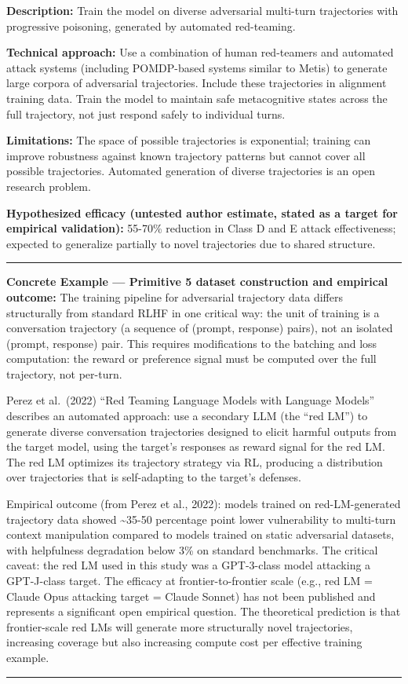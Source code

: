 \documentclass[
  11pt,
]{article}
\renewenvironment{quote}{%
  \par\addvspace{0.7em}%
  \noindent\rule{\linewidth}{1.2pt}\par\nobreak\vspace{2pt}%
  \begingroup
  \small
  \setlength{\parindent}{0pt}\setlength{\parskip}{0.3em}%
  \setlength{\leftskip}{0.9em}\setlength{\rightskip}{0.4em}%
  \ignorespaces
}{%
  \par\endgroup\vspace{2pt}%
  \noindent\rule{\linewidth}{0.4pt}\par\addvspace{0.7em}%
}
\begin{document}
\textbf{Description:} Train the model on diverse adversarial multi-turn
trajectories with progressive poisoning, generated by automated
red-teaming.

\textbf{Technical approach:} Use a combination of human red-teamers and
automated attack systems (including POMDP-based systems similar to
Metis) to generate large corpora of adversarial trajectories. Include
these trajectories in alignment training data. Train the model to
maintain safe metacognitive states across the full trajectory, not just
respond safely to individual turns.

\textbf{Limitations:} The space of possible trajectories is exponential;
training can improve robustness against known trajectory patterns but
cannot cover all possible trajectories. Automated generation of diverse
trajectories is an open research problem.

\textbf{Hypothesized efficacy (untested author estimate, stated as a target for empirical validation):} 55-70\% reduction in Class D and E attack
effectiveness; expected to generalize partially to novel trajectories
due to shared structure.

\begin{quote}
\textbf{Concrete Example --- Primitive 5 dataset construction and
empirical outcome:} The training pipeline for adversarial trajectory
data differs structurally from standard RLHF in one critical way: the
unit of training is a conversation trajectory (a sequence of (prompt,
response) pairs), not an isolated (prompt, response) pair. This requires
modifications to the batching and loss computation: the reward or
preference signal must be computed over the full trajectory, not
per-turn.

Perez et al.~(2022) ``Red Teaming Language Models with Language Models''
describes an automated approach: use a secondary LLM (the ``red LM'') to
generate diverse conversation trajectories designed to elicit harmful
outputs from the target model, using the target's responses as reward
signal for the red LM. The red LM optimizes its trajectory strategy via
RL, producing a distribution over trajectories that is self-adapting to
the target's defenses.

Empirical outcome (from Perez et al., 2022): models trained on
red-LM-generated trajectory data showed \textasciitilde35-50 percentage
point lower vulnerability to multi-turn context manipulation compared to
models trained on static adversarial datasets, with helpfulness
degradation below 3\% on standard benchmarks. The critical caveat: the
red LM used in this study was a GPT-3-class model attacking a
GPT-J-class target. The efficacy at frontier-to-frontier scale (e.g.,
red LM = Claude Opus attacking target = Claude Sonnet) has not been
published and represents a significant open empirical question. The
theoretical prediction is that frontier-scale red LMs will generate more
structurally novel trajectories, increasing coverage but also increasing
compute cost per effective training example.
\end{quote}
\end{document}
